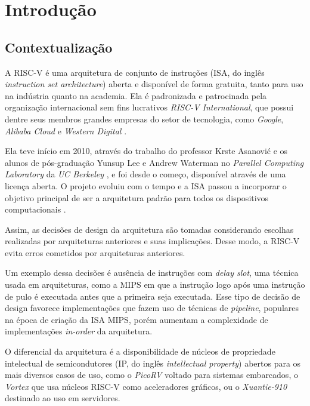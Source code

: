 
\chapter{Introdução}
\label{cap:introducao}

\section{Contextualização}
\label{sec:ic}

A RISC-V é uma arquitetura de conjunto de instruções (ISA, do inglês 
\emph{instruction set architecture}) aberta e disponível de forma gratuita, 
tanto para uso na indústria quanto na academia. 
Ela é padronizada e patrocinada pela organização 
internacional sem fins lucrativos \emph{RISC-V International},
que possui dentre seus membros grandes 
empresas do setor de tecnologia, como \emph{Google}, \emph{Alibaba Cloud} e 
\emph{Western Digital} \citep{MEM}.

Ela teve início em 2010, através do trabalho do professor Krste Asanović e os 
alunos de pós-graduação Yunsup Lee e Andrew Waterman no \emph{Parallel Computing
Laboratory} da \emph{UC Berkeley} \citep{RVH}, e foi desde o começo, disponível 
através de uma licença aberta. O projeto evoluiu com o tempo e a ISA passou 
a incorporar o objetivo principal de ser a arquitetura padrão para todos os dispositivos 
computacionais \citep{Asanović:EECS-2014-146}.

Assim, as decisões de design da arquitetura são tomadas considerando escolhas 
realizadas por arquiteturas anteriores e suas implicações. Desse modo, a RISC-V
evita erros cometidos por arquiteturas anteriores.

Um exemplo dessa decisões é 
ausência de instruções com \emph{delay slot}, uma técnica usada 
em arquiteturas, como a MIPS \citep{DSTL} em que a instrução logo após uma instrução
de pulo é executada antes que a primeira seja executada. Esse tipo de decisão de design
favorece implementações que fazem uso de técnicas de \emph{pipeline},
populares na época de criação da ISA MIPS, porém aumentam a complexidade de implementações \emph{in-order} 
da arquitetura.

O diferencial da arquitetura é a disponibilidade de núcleos de propriedade intelectual
de semicondutores (IP, do inglês \emph{intellectual property}) abertos para os mais 
diversos casos de uso, como o \emph{PicoRV} \citep{PICO} voltado para sistemas embarcados, 
o \emph{Vortex} \citep{elsabbagh2020vortex} que usa núcleos RISC-V como aceleradores 
gráficos, ou o \emph{Xuantie-910} \citep{9138983} destinado ao uso em servidores.

